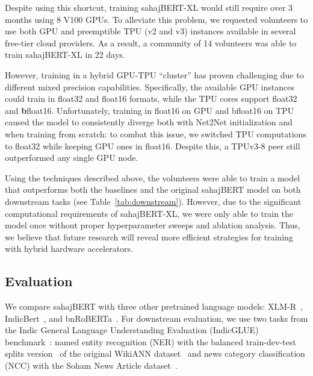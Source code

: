 Despite using this shortcut, training sahajBERT-XL would still require over 3 months using 8 V100 GPUs. To alleviate this problem, we requested volunteers to use both GPU and preemptible TPU (v2 and v3) instances available in several free-tier cloud providers. As a result, a community of 14 volunteers was able to train sahajBERT-XL in 22 days.

However, training in a hybrid GPU-TPU ``cluster'' has proven challenging due to different mixed precision capabilities. Specifically, the available GPU instances could train in float32 and float16 formats, while the TPU cores support float32 and \textbf{b}float16. Unfortunately, training in float16 on GPU and bfloat16 on TPU caused the model to consistently diverge both with Net2Net initialization and when training from scratch: to combat this issue, we switched TPU computations to float32 while keeping GPU ones in float16. Despite this, a TPUv3-8 peer still outperformed any single GPU node.

Using the techniques described above, the volunteers were able to train a model that outperforms both the baselines and the original sahajBERT model on both downstream tasks (see Table~\ref{tab:downstream}). However, due to the significant computational requirements of sahajBERT-XL, we were only able to train the model once without proper hyperparameter sweeps and ablation analysis. Thus, we believe that future research will reveal more efficient strategies for training with hybrid hardware accelerators.


\subsection{Evaluation}\label{appendix:exp_bengali_evaluation}

We compare sahajBERT with three other pretrained language models: XLM-R~\cite{xlmr}, IndicBert~\cite{kakwani-etal-2020-indicnlpsuite}, and bnRoBERTa~\cite{jain2020indictransformers}. For downstream evaluation, we use two tasks from the Indic General
Language Understanding Evaluation (IndicGLUE) benchmark~\cite{kakwani-etal-2020-indicnlpsuite}: named entity recognition (NER) with the balanced train-dev-test splits version~\cite{rahimi-etal-2019-massively} of the original WikiANN dataset~\cite{pan-etal-2017-cross} and news category classification (NCC) with the Soham News Article dataset~\cite{kakwani-etal-2020-indicnlpsuite}.


